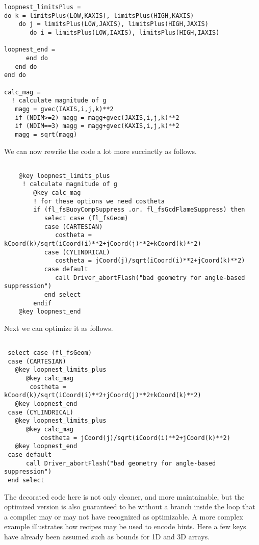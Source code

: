 \documentclass{article}
\begin{document}
\begin{verbatim}
loopnest_limitsPlus =
do k = limitsPlus(LOW,KAXIS), limitsPlus(HIGH,KAXIS)
    do j = limitsPlus(LOW,JAXIS), limitsPlus(HIGH,JAXIS)
       do i = limitsPlus(LOW,IAXIS), limitsPlus(HIGH,IAXIS)

loopnest_end =
      end do
   end do
end do

calc_mag =
  ! calculate magnitude of g
   magg = gvec(IAXIS,i,j,k)**2
   if (NDIM>=2) magg = magg+gvec(JAXIS,i,j,k)**2
   if (NDIM==3) magg = magg+gvec(KAXIS,i,j,k)**2
   magg = sqrt(magg)

\end{verbatim}

We can now rewrite the code a lot more succinctly as follows.
\begin{verbatim}

    @key loopnest_limits_plus
     ! calculate magnitude of g
        @key calc_mag
        ! for these options we need costheta
        if (fl_fsBuoyCompSuppress .or. fl_fsGcdFlameSuppress) then
           select case (fl_fsGeom)
           case (CARTESIAN)
              costheta = kCoord(k)/sqrt(iCoord(i)**2+jCoord(j)**2+kCoord(k)**2)
           case (CYLINDRICAL)
              costheta = jCoord(j)/sqrt(iCoord(i)**2+jCoord(k)**2)
           case default
              call Driver_abortFlash("bad geometry for angle-based suppression")
           end select
        endif
    @key loopnest_end
\end{verbatim}

Next we can optimize it as follows.
\begin{verbatim}

 select case (fl_fsGeom)
 case (CARTESIAN)
   @key loopnest_limits_plus
      @key calc_mag
       costheta = kCoord(k)/sqrt(iCoord(i)**2+jCoord(j)**2+kCoord(k)**2)
   @key loopnest_end
 case (CYLINDRICAL)
   @key loopnest_limits_plus
      @key calc_mag
          costheta = jCoord(j)/sqrt(iCoord(i)**2+jCoord(k)**2)
   @key loopnest_end
 case default
      call Driver_abortFlash("bad geometry for angle-based suppression")
 end select
\end{verbatim}

The decorated code here is not only cleaner, and more maintainable,
but the optimized version is also guaranteed to be without a branch inside the loop that a
compiler may or may not have recognized as optimizable. A
more complex example illustrates how recipes may be used to encode
hints. Here a few keys have already been assumed such as bounds for
1D and 3D arrays.
\end{document}
